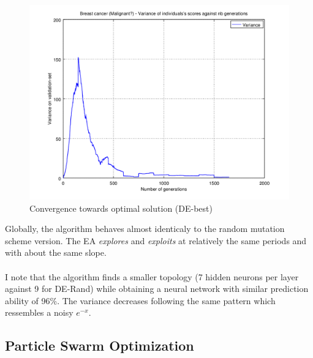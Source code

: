 \documentclass[a4paper,12pt, oneside]{memoir}
\begin{document}
\begin{figure}[h]
  \centering
  \includegraphics[scale=0.7]{malignant-varianceVSepochs-DE-BEST}
  \vspace{-12pt}
  \caption{Convergence towards optimal solution (DE-best)}
  \label{malignant-variance-DE-best}
\end{figure}

Globally, the algorithm behaves almost identicaly to the random mutation scheme version. The EA \textit{explores} and \textit{exploits} at relatively the same periods and with about the same slope. 
\\ \\
I note that the algorithm finds a smaller topology (7 hidden neurons per layer against 9 for DE-Rand) while obtaining a neural network with similar prediction ability of 96\%. The variance decreases following the same pattern which ressembles a noisy $e^{-x}$.  

\subsection{Particle Swarm Optimization}
\end{document}
